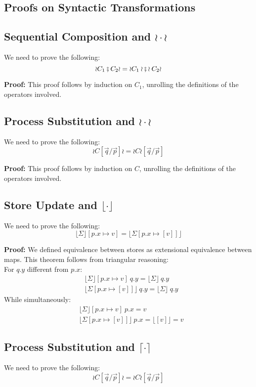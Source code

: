 \documentclass[12pt,a4paper,twoside]{book}
\begin{document}
\begin{appendices}
\chapter{Proofs on Syntactic Transformations}
\label{appdix:A}
\section{Sequential Composition and $\wr \cdot \wr$}
We need to prove the following:
$$\wr C_1 \fatsemi C_2 \wr = \wr C_1 \wr \fatsemi \wr C_2 \wr$$

\noindent\textbf{Proof:}
This proof follows by induction on $C_1$, unrolling the definitions of the operators involved.

\section{Process Substitution and $\wr \cdot \wr$}
We need to prove the following:
$$\wr C [\vec{q}/\vec{p}] \wr = \wr C \wr [\vec{q}/\vec{p}]$$

\noindent\textbf{Proof:}
This proof follows by induction on $C$, unrolling the definitions of the operators involved.

\section{Store Update and $\lfloor \cdot \rfloor$}
We need to prove the following:
$$\lfloor \Sigma \rfloor[p.x \mapsto v] = \lfloor \Sigma[p.x \mapsto [v]] \rfloor$$

\noindent\textbf{Proof:}
We defined equivalence between stores as extensional equivalence between maps.
This theorem follows from triangular reasoning:\\
For $q.y$ different from $p.x$:
\begin{align*}
&\lfloor \Sigma \rfloor[p.x \mapsto v]~q.y = \lfloor \Sigma \rfloor~q.y\\
&\lfloor \Sigma [p.x \mapsto [v]] \rfloor~q.y = \lfloor \Sigma \rfloor~q.y
\end{align*}
While simultaneously:
\begin{align*}
&\lfloor \Sigma \rfloor[p.x \mapsto v]~p.x = v\\
&\lfloor \Sigma [p.x \mapsto [v]] \rfloor~p.x = \lfloor [v] \rfloor = v
\end{align*}


\section{Process Substitution and $\lceil \cdot \rceil$}
We need to prove the following:
$$\wr C [\vec{q}/\vec{p}] \wr = \wr C \wr [\vec{q}/\vec{p}]$$


\end{appendices}
\end{document}
